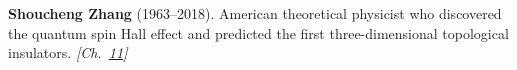 \textbf{Shoucheng Zhang} (1963–2018). American theoretical physicist who discovered the quantum spin Hall effect and predicted the first three-dimensional topological insulators. \emph{[Ch.~\hyperref[ch:topologicalinsulators]{11}]}

